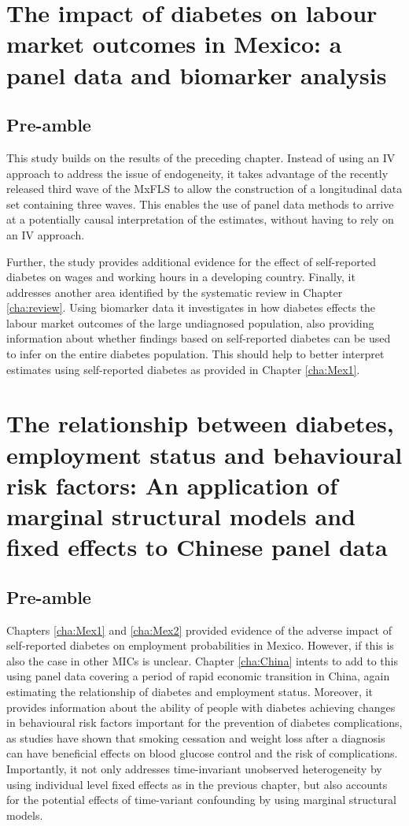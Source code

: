 \chapter{\label{cha:Mex2}The impact of diabetes on labour market outcomes in Mexico: a panel data and biomarker analysis}
\section*{Pre-amble}

This study builds on the results of the preceding chapter. Instead of using an \ac{IV} approach to address the issue of endogeneity, it takes advantage of the recently released third wave of the \ac{MxFLS} to allow the construction of a longitudinal data set containing three waves. This enables the use of panel data methods to arrive at a potentially causal interpretation of the estimates, without having to rely on an \ac{IV} approach.

Further, the study provides additional evidence for the effect of self-reported diabetes on wages and working hours in a developing country. Finally, it addresses another area identified by the systematic review in Chapter \ref{cha:review}. Using biomarker data it investigates in how diabetes effects the labour market outcomes of the large undiagnosed population, also providing information about whether findings based on self-reported diabetes can be used to infer on the entire diabetes population. This should help to better interpret estimates using self-reported diabetes as provided in Chapter \ref{cha:Mex1}.


\acresetall  %
\chapter{\label{cha:China} The relationship between diabetes, employment status and behavioural risk factors: An application of marginal structural models and fixed effects to Chinese panel data}
\section*{Pre-amble}

Chapters \ref{cha:Mex1} and \ref{cha:Mex2} provided evidence of the adverse impact of self-reported diabetes on employment probabilities in Mexico. However, if this is also the case in other \acp{MIC} is unclear. Chapter \ref{cha:China} intents to add to this using panel data covering a period of rapid economic transition in China, again estimating the relationship of diabetes and employment status. Moreover, it provides information about the ability of people with diabetes achieving changes in behavioural risk factors important for the prevention of diabetes complications, as studies have shown that smoking cessation and weight loss after a diagnosis can have beneficial effects on blood glucose control and the risk of complications. Importantly, it not only addresses time-invariant unobserved heterogeneity by using individual level fixed effects as in the previous chapter, but also accounts for the potential effects of time-variant confounding by using marginal structural models.

